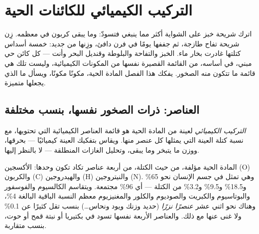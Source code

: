 \chapter{التركيب الكيميائي للكائنات الحية}\label{ch:g10:chemistry-of-life}

اترك شريحة خبز على الشواية أكثر مما ينبغي فتسودّ: وما يبقى كربون في
معظمه. زِن شريحة تفاح طازجة، ثم جففها يومًا في فرن دافئ، وزِنها من
جديد: خمسة أسداس كتلتها غادرت بخار ماء. الخبز والتفاحة والبلوطة
وقنديل البحر وأنت --- كل كائن حي مبني، في أساسه، من القائمة القصيرة
نفسها من المكونات الكيميائية، وليست تلك هي قائمة ما تتكون منه الصخور.
يفكك هذا الفصل المادة الحية، مكونًا مكونًا، ويسأل ما الذي يجعلها
متميزة.

\section{العناصر: ذرات الصخور نفسها، بنسب مختلفة}

\begin{definition}\label{def:g10:chemistry-of-life:composition}
\emph{التركيب الكيميائي} لعينة من المادة الحية
هو قائمة العناصر الكيميائية التي تحتويها، مع نسبة كتلة العينة التي
يمثلها كل عنصر منها. ويقاس بتفكيك العينة كيميائيًا --- بحرقها، ووزن
ما يتبخر وما يبقى، وتحليل الغازات المنطلقة --- لا بالنظر إليها.
\end{definition}

\begin{proposition}\label{prop:g10:chemistry-of-life:four}
المادة الحية مؤلفة، من حيث الكتلة، من أربعة عناصر تكاد تكون وحدها:
الأكسجين (O) والكربون (C) والهيدروجين (H) والنيتروجين (N). وهي تمثل
في جسم الإنسان نحو 65\% و18.5\% و9.5\% و3.2\% من الكتلة --- أي 96\%
مجتمعة. ويتقاسم الكالسيوم والفوسفور والبوتاسيوم والكبريت والصوديوم
والكلور والمغنيزيوم معظم النسبة الباقية البالغة 4\%، وهناك نحو اثني
عشر \emph{عنصرًا نزرًا} (حديد وزنك ويود ونحاس\dots) بنسب تقل كثيرًا
عن 0.1\% ولا غنى عنها مع ذلك. والعناصر الأربعة نفسها تسود في بكتيريا
أو نبتة قمح أو حوت، بنسب متقاربة.
\end{proposition}
\admitted

